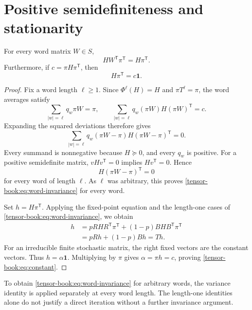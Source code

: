 \section{Positive semidefiniteness and stationarity}
\begin{lemma}\label{tensor-book:lem:word-invariance}
For every word matrix $W\in S$,
\begin{equation}\label{tensor-book:eq:word-invariance}
 HW^{\mathsf{T}}\pi^{\mathsf{T}}=H\pi^{\mathsf{T}}.
\end{equation}
Furthermore, if $c=\pi H\pi^{\mathsf{T}}$, then
\begin{equation}\label{tensor-book:eq:constant}
 H\pi^{\mathsf{T}}=c\mathbf{1}.
\end{equation}
\end{lemma}
\begin{proof}
Fix a word length $\ell\ge1$. Since $\Phi^\ell(H)=H$ and
$\pi T^\ell=\pi$, the word averages satisfy
\[
 \sum_{|w|=\ell}q_w\pi W=\pi,
 \qquad
 \sum_{|w|=\ell}q_w(\pi W)H(\pi W)^{\mathsf{T}}=c.
\]
Expanding the squared deviations therefore gives
\begin{equation}\label{tensor-book:eq:variance}
 \sum_{|w|=\ell}q_w
 (\pi W-\pi)H(\pi W-\pi)^{\mathsf{T}}=0.
\end{equation}
Every summand is nonnegative because $H\succeq0$, and every $q_w$ is
positive. For a positive semidefinite matrix, $vHv^{\mathsf{T}}=0$ implies
$Hv^{\mathsf{T}}=0$. Hence
\[
 H(\pi W-\pi)^{\mathsf{T}}=0
\]
for every word of length $\ell$. As $\ell$ was arbitrary, this proves
\eqref{tensor-book:eq:word-invariance} for every word.

Set $h=H\pi^{\mathsf{T}}$. Applying the fixed-point equation and the
length-one cases of \eqref{tensor-book:eq:word-invariance}, we obtain
\[
 \begin{aligned}
 h&=pRH R^{\mathsf{T}}\pi^{\mathsf{T}}+(1-p)BH B^{\mathsf{T}}\pi^{\mathsf{T}}\\
  &=pRh+(1-p)Bh=Th.
 \end{aligned}
\]
For an irreducible finite stochastic matrix, the right fixed vectors
are the constant vectors. Thus $h=\alpha\mathbf{1}$. Multiplying by $\pi$
gives $\alpha=\pi h=c$, proving \eqref{tensor-book:eq:constant}.
\end{proof}

\begin{remark}
To obtain \eqref{tensor-book:eq:word-invariance} for arbitrary words, the variance
identity is applied separately at every word length. The length-one
identities alone do not justify a direct iteration without a further
invariance argument.
\end{remark}

